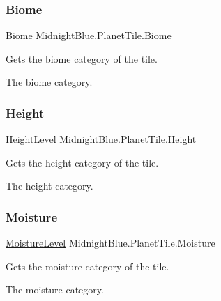 \subsubsection{\texorpdfstring{Biome}{Biome}}
{\footnotesize\ttfamily \hyperlink{namespace_midnight_blue_a8a6ba5637b64c3eb991f00d48decf381}{Biome} Midnight\+Blue.\+Planet\+Tile.\+Biome\hspace{0.3cm}{\ttfamily [get]}}



Gets the biome category of the tile. 

The biome category.\hypertarget{class_midnight_blue_1_1_planet_tile_a64d018817a484ab3b4559773b0971974}{}\label{class_midnight_blue_1_1_planet_tile_a64d018817a484ab3b4559773b0971974} 
\subsubsection{\texorpdfstring{Height}{Height}}
{\footnotesize\ttfamily \hyperlink{namespace_midnight_blue_a86f8aaa0bbb651a6a094d3eb95f799e0}{Height\+Level} Midnight\+Blue.\+Planet\+Tile.\+Height\hspace{0.3cm}{\ttfamily [get]}}



Gets the height category of the tile. 

The height category.\hypertarget{class_midnight_blue_1_1_planet_tile_a867d91b1185e400c608eea5e20ba4614}{}\label{class_midnight_blue_1_1_planet_tile_a867d91b1185e400c608eea5e20ba4614} 
\subsubsection{\texorpdfstring{Moisture}{Moisture}}
{\footnotesize\ttfamily \hyperlink{namespace_midnight_blue_a7428767e7fc0b52bab6cb270f8354e1d}{Moisture\+Level} Midnight\+Blue.\+Planet\+Tile.\+Moisture\hspace{0.3cm}{\ttfamily [get]}}



Gets the moisture category of the tile. 

The moisture category.\hypertarget{class_midnight_blue_1_1_planet_tile_a7e2a7e01274b4ea505871b115b8534ae}{}\label{class_midnight_blue_1_1_planet_tile_a7e2a7e01274b4ea505871b115b8534ae} 
